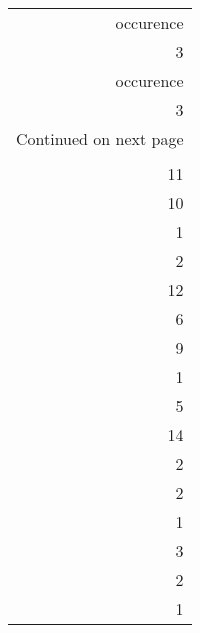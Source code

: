 \begin{longtable}{r}
\toprule
 occurence \\
         3 \\
\midrule
\endfirsthead

\toprule
 occurence \\
         3 \\
\midrule
\endhead
\midrule
\multicolumn{1}{r}{{Continued on next page}} \\
\midrule
\endfoot

\bottomrule
\endlastfoot
         7 \\
        11 \\
        10 \\
         1 \\
         2 \\
        12 \\
         6 \\
         9 \\
         1 \\
         5 \\
        14 \\
         2 \\
         2 \\
         1 \\
         3 \\
         2 \\
         1 \\
\end{longtable}

